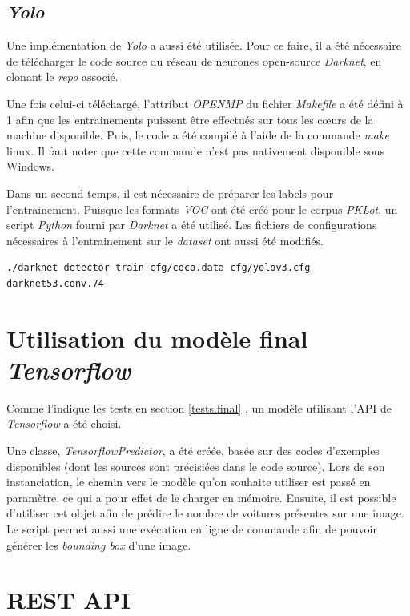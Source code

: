 \subsection{\textit{Yolo}}
Une implémentation de \textit{Yolo} a aussi été utilisée. Pour ce faire, il a été nécessaire de télécharger le code source du réseau de neurones open-source \textit{Darknet}\autocite{lib:yolo}, en clonant le \textit{repo} associé.

Une fois celui-ci téléchargé, l'attribut \textit{OPENMP} du fichier \textit{Makefile} a été défini à 1 afin que les entrainements puissent être effectués sur tous les cœurs de la machine disponible. Puis, le code a été compilé à l'aide de la commande \textit{make} linux. Il faut noter que cette commande n'est pas nativement disponible sous Windows.

Dans un second temps, il est nécessaire de préparer les labels pour l'entrainement. Puisque les formats \textit{VOC} ont été créé pour le corpus \textit{PKLot}, un script \textit{Python} fourni par \textit{Darknet} a été utilisé. Les fichiers de configurations nécessaires à l'entrainement sur le \textit{dataset} ont aussi été modifiés. 

\begin{lstlisting}[caption={Exécution d'un entrainement à l'aide de \textit{Yolo}}, label={lst:voc}, numbers=none] 
./darknet detector train cfg/coco.data cfg/yolov3.cfg darknet53.conv.74
\end{lstlisting}


\section{Utilisation du modèle final \textit{Tensorflow}} 
Comme l'indique les tests en section \ref{tests.final} , un modèle utilisant l'API de \textit{Tensorflow} a été choisi. 

Une classe, \textit{TensorflowPredictor}, a été créée, basée sur des codes d'exemples disponibles (dont les sources sont précisiées dans le code source). Lors de son instanciation, le chemin vers le modèle qu'on souhaite utiliser est passé en paramètre, ce qui a pour effet de le charger en mémoire. Ensuite, il est possible d'utiliser cet objet afin de prédire le nombre de voitures présentes sur une image. Le script permet aussi une exécution en ligne de commande afin de pouvoir générer les \textit{bounding box} d'une image.

\section{REST API}





